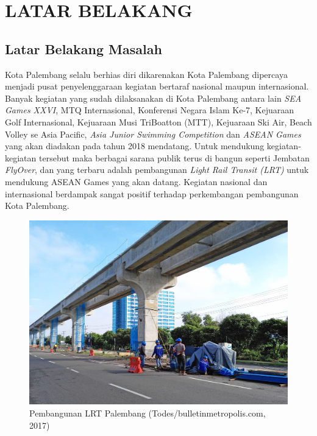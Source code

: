 
\chapter{LATAR BELAKANG}

\section{Latar Belakang Masalah}
Kota Palembang selalu berhias diri dikarenakan Kota Palembang dipercaya menjadi pusat penyelenggaraan kegiatan bertaraf nasional maupun internasional. Banyak kegiatan yang sudah dilaksanakan di Kota Palembang antara lain \emph{SEA Games XXVI}, MTQ Internasional, Konferensi Negara Islam Ke-7, Kejuaraan Golf Internasional, Kejuaraan Musi TriBoatton (MTT), Kejuaraan Ski Air, Beach Volley se Asia Pacific, \emph{Asia Junior Swimming Competition} dan \emph{ASEAN Games} yang akan diadakan pada tahun 2018 mendatang. Untuk mendukung kegiatan-kegiatan tersebut maka berbagai sarana publik terus di bangun seperti Jembatan \emph{FlyOver}, dan yang terbaru adalah pembangunan \emph{Light Rail Transit (LRT)} untuk mendukung ASEAN Games yang akan datang. Kegiatan nasional dan internasional berdampak sangat positif terhadap perkembangan pembangunan Kota Palembang. \\

\begin{figure}[H]
  \centering
    \includegraphics[scale=0.2]{gambar/lrt.jpg}
    \caption{Pembangunan LRT Palembang (Todes/bulletinmetropolis.com, 2017)}
    \label{fig:lrt}
\end{figure}

